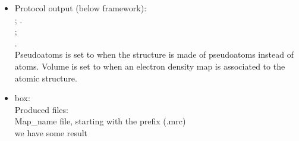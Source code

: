 \begin{itemize}
\begin{itemize}
   \begin{itemize}
     \item Protocol output (below \scipion framework):\\
      ; .\\
      ;\\ .\\Pseudoatoms is set to  when the structure is made of pseudoatoms instead of atoms. Volume is set to  when an electron density map is associated to the atomic structure.
     \item {} box:\\Produced files:\\Map\_name file, starting with the prefix (.mrc)\\we have some result
    \end{itemize}
    
   \end{itemize} 
  
 \end{itemize}


